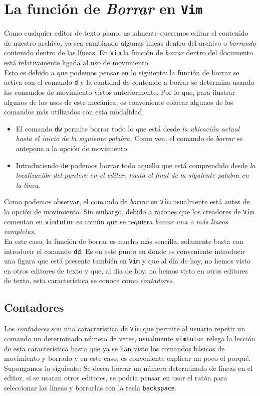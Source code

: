 \documentclass[10pt]{article}
\begin{document}
\section{La función de \textit{Borrar} en \texttt{Vim}}
Como cualquier editor de texto plano, usualmente queremos editar el contenido de nuestro archivo, ya sea cambiando algunas lineas dentro del archivo o \textit{borrando} contenido dentro de las líneas. En \texttt{Vim} la función de \textit{borrar} dentro del documento está relativamente ligada al uso de movimiento.\\
Esto es debido a que podemos pensar en lo siguiente: la función de borrar se activa con el comando \texttt{d} y la cantidad de contenido a borrar se determina usando los comandos de movimiento vistos anteriormente. Por lo que, para ilustrar algunos de los usos de este mecánica, es conveniente colocar algunos de los comandos más utilizados con esta modalidad. 
\begin{itemize}
	\item El comando \texttt{dw} permite borrar todo lo que está desde \textit{la ubicación actual hasta el inicio de la siguiente palabra.} Como ven, el comando de \textit{borrar} se antepone a la opción de movimiento.
	\item Introduciendo \texttt{de} podemos borrar todo aquello que está comprendido desde \textit{la localización del puntero en el editor, hasta el final de la siguiente palabra en la linea}. 
\end{itemize}
Como podemos observar, el comando de \textit{borrar} en \texttt{Vim} usualmente está antes de la opción de movimiento. Sin embargo, debido a razones que los creadores de \texttt{Vim} comentan en \texttt{vimtutor} es común que se requiera \textit{borrar una o más lineas completas}. \\
En este caso, la función de borrar es mucho más sencilla, solamente basta con introducir el comando \texttt{dd}. Es en este punto en donde es conveniente introducir una figura que está presente también en \texttt{Vim} y que al día de hoy, no hemos visto en otros editores de texto y que, al día de hoy, no hemos visto en otros editores de texto, esta característica se conoce como \textit{contadores}.
\subsection{Contadores}
Los \textit{contadores} son una característica de \texttt{Vim} que permite al usuario repetir un comando un determinado número de veces, usualmente \texttt{vimtutor} relega la lección de esta característica hasta que ya se han visto los comandos básicos de movimiento y borrado y en este caso, es conveniente explicar un poco el porqué. Supongamos lo siguiente: Se desea borrar un número determinado de líneas en el editor, si se usaran otros editores, se podría pensar en usar el ratón para seleccionar las líneas y borrarlas con la tecla \texttt{backspace}.
\end{document}
